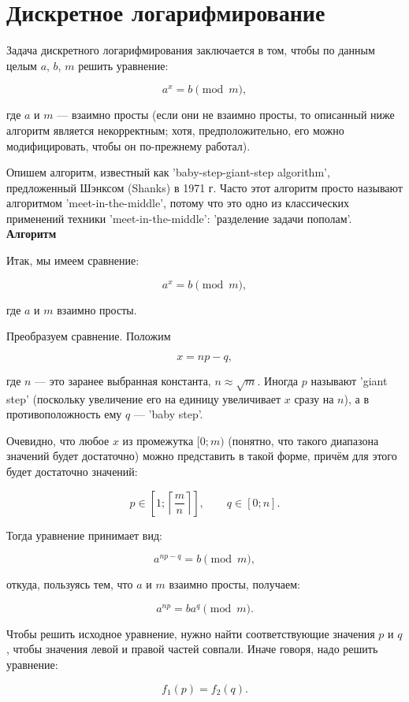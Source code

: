 \documentclass[12pt,a4paper]{scrartcl}
\begin{document}
	
\section{Дискретное логарифмирование}

Задача дискретного логарифмирования заключается в том, чтобы по данным целым $a$, $b$, $m$ решить уравнение:

$$a^x = b \pmod m,$$

где $a$ и $m$ — взаимно просты (если они не взаимно просты, то описанный ниже алгоритм является некорректным; хотя, предположительно, его можно модифицировать, чтобы он по-прежнему работал).

Опишем алгоритм, известный как 'baby-step-giant-step algorithm', предложенный Шэнксом (Shanks) в 1971 г. Часто этот алгоритм просто называют алгоритмом 'meet-in-the-middle', потому что это одно из классических применений техники 'meet-in-the-middle': 'разделение задачи пополам'.\\

\textbf{Алгоритм}

Итак, мы имеем сравнение:

$$a^x = b \pmod m,$$

где $a$ и $m$ взаимно просты.

Преобразуем сравнение. Положим

$$x = np - q,$$

где $n$ — это заранее выбранная константа,  $n \approx \sqrt{m}$. Иногда $p$ называют 'giant step' (поскольку увеличение его на единицу увеличивает $x$ сразу на $n$), а в противоположность ему $q$ — 'baby step'.

Очевидно, что любое $x$ из промежутка $[0;m)$ (понятно, что такого диапазона значений будет достаточно) можно представить в такой форме, причём для этого будет достаточно значений:

$$p \in \left[ 1; \left\lceil \frac{m}{n} \right\rceil \right],\qquad q \in [0;n].$$

Тогда уравнение принимает вид:

$$a^{np-q} = b \pmod m,$$

откуда, пользуясь тем, что $a$ и $m$ взаимно просты, получаем:

$$a^{np} = b a^q \pmod m.$$

Чтобы решить исходное уравнение, нужно найти соответствующие значения $p$ и $q$, чтобы значения левой и правой частей совпали. Иначе говоря, надо решить уравнение:

$$f_1(p) = f_2(q).$$
\end{document}
